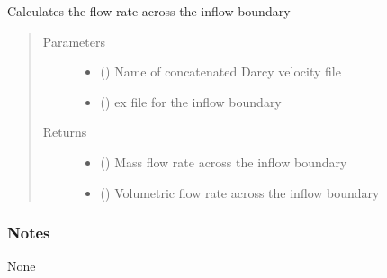 \documentclass[letterpaper,10pt,english]{sphinxmanual}
\begin{document}
\begin{fulllineitems}
\label{\detokenize{pydfnworks:pydfnworks.dfnFlow.mass_balance.flow_rate}}
Calculates the flow rate across the inflow boundary
\begin{quote}\begin{description}
\item[{Parameters}] \leavevmode\begin{itemize}
\item {} 
 () \textendash{} Name of concatenated Darcy velocity file

\item {} 
 () \textendash{} ex file for the inflow boundary

\end{itemize}

\item[{Returns}] \leavevmode
\begin{itemize}
\item {} 
 () \textendash{} Mass flow rate across the inflow boundary

\item {} 
 () \textendash{} Volumetric flow rate across the inflow boundary

\end{itemize}


\end{description}\end{quote}
\subsubsection*{Notes}

None

\end{fulllineitems}

\end{document}

